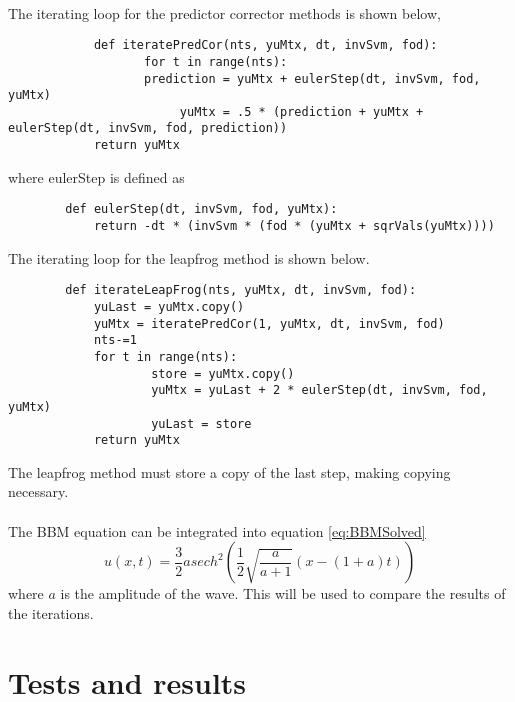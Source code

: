 \documentclass[a4paper,12pt]{article}
\begin{document}
	\paragraph*{}
		The iterating loop for the predictor corrector methods is shown below,
		\begin{verbatim}
			def iteratePredCor(nts, yuMtx, dt, invSvm, fod):
				   for t in range(nts):
			       prediction = yuMtx + eulerStep(dt, invSvm, fod, yuMtx)
				      	yuMtx = .5 * (prediction + yuMtx + eulerStep(dt, invSvm, fod, prediction))
			return yuMtx
		\end{verbatim}
		where eulerStep is defined as 
		\begin{verbatim}
		def eulerStep(dt, invSvm, fod, yuMtx):
	   		return -dt * (invSvm * (fod * (yuMtx + sqrVals(yuMtx))))

		\end{verbatim}
		The iterating loop for the leapfrog method is shown below.
		\begin{verbatim}
		def iterateLeapFrog(nts, yuMtx, dt, invSvm, fod):
		   	yuLast = yuMtx.copy()
		   	yuMtx = iteratePredCor(1, yuMtx, dt, invSvm, fod)
		   	nts-=1
		   	for t in range(nts):
		      		store = yuMtx.copy()
			      	yuMtx = yuLast + 2 * eulerStep(dt, invSvm, fod, yuMtx)
			      	yuLast = store
			return yuMtx
		\end{verbatim}
		The leapfrog method must store a copy of the last step, making copying necessary. 
	\paragraph*{} 
		The BBM equation can be integrated into equation \ref{eq:BBMSolved}
		\begin{equation}
			\label{eq:BBMSolved}
			u(x, t) = \frac{3}{2}asech^{2}(\frac{1}{2}\sqrt{\frac{a}{a+1}}(x-(1+a)t))
		\end{equation}
		where $a$ is the amplitude of the wave.  This will be used to compare the results of the iterations.

\section{Tests and results}
	
\end{document}
